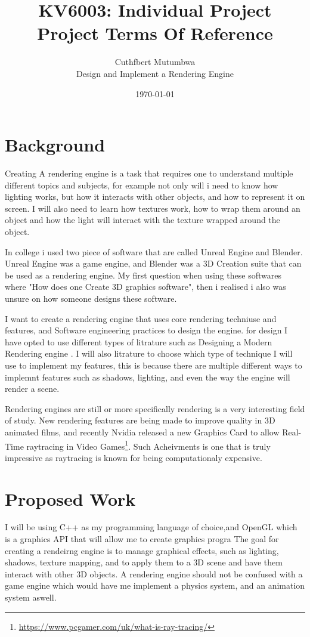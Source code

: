 \title{KV6003: Individual Project\\ Project Terms Of Reference}
\author{Cuthfbert Mutumbwa\\ Design and Implement a Rendering Engine}
\date{\today}

\maketitle

\section{Background}
Creating A rendering engine is a task that requires one to understand multiple different topics and subjects, for example not only will i need to know how lighting works, but how it interacts with other objects, and how to represent it on screen. I will also need to learn how textures work, how to wrap them around an object and how the light will interact with the texture wrapped around the object.

In college i used two piece of software that are called Unreal Engine and Blender. Unreal Engine was a game engine, and Blender was a 3D Creation suite that can be used as a rendering engine.
My first question when using these softwares where "How does one Create 3D graphics software", then i realised i also was unsure on how someone designs these software.

I want to create a rendering engine that uses core rendering techniuse and features, and Software engineering practices to design the engine. for design I have opted to use different types of litrature such as Designing a Modern Rendering engine \citep{designengine}.  I will also litrature to choose which type of technique I will use to implement my features, this is because there are multiple different ways to implemnt features such as shadows, lighting, and even the way the engine will render a scene.

Rendering engines are still or more specifically rendering is a very interesting field of study. New rendering features are being made to improve quality in 3D animated films, and recently Nvidia released a new Graphics Card to allow Real-Time raytracing in Video Games\footnote{\url{https://www.pcgamer.com/uk/what-is-ray-tracing/}}. Such Acheivments is one that is truly impressive as raytracing is known for being computationaly expensive. 


\section{Proposed Work}
I will be using C++ as my programming language of choice,and OpenGL which is a graphics API that will allow me to create graphics progra
The goal for creating a rendeirng engine is to manage graphical effects, such as lighting, shadows, texture mapping, and to apply them to a 3D scene and have them interact with other 3D objects. A rendering engine should not be confused with a game engine which would have me implement a physics system, and an animation system aswell.

